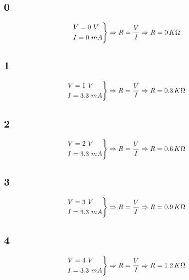 \documentclass{article}
\begin{document}
		\subsection{0}
			\begin{equation*}
				\begin{rcases}
					V = 0 \ V  \\	
					I = 0 \ mA
				\end{rcases}
				\Rightarrow R = \frac{V}{I} \Rightarrow R = 0 \, K \Omega
			\end{equation*}
		
		\subsection{1}
		\begin{equation*}
			\begin{rcases}
				V = 1 \ V  \\	
				I = 3.3 \ mA
			\end{rcases}
			\Rightarrow R = \frac{V}{I} \Rightarrow R = 0.3 \, K \Omega
		\end{equation*}
		
		\subsection{2}
		\begin{equation*}
			\begin{rcases}
				V = 2 \ V  \\	
				I = 3.3 \ mA
			\end{rcases}
			\Rightarrow R = \frac{V}{I} \Rightarrow R = 0.6 \, K \Omega
		\end{equation*}
		
		\subsection{3}
		\begin{equation*}
			\begin{rcases}
				V = 3 \ V  \\	
				I = 3.3 \ mA
			\end{rcases}
			\Rightarrow R = \frac{V}{I} \Rightarrow R = 0.9 \, K \Omega
		\end{equation*}
		
		\subsection{4}
		\begin{equation*}
			\begin{rcases}
				V = 4 \ V  \\	
				I = 3.3 \ mA
			\end{rcases}
			\Rightarrow R = \frac{V}{I} \Rightarrow R = 1.2 \, K \Omega
		\end{equation*}
		
\end{document}
